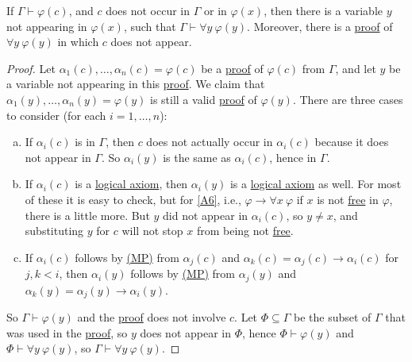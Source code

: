 \begin{lemma}\label{lma:lec8}
	If \(\Gamma \vdash \varphi (c)\), and \(c\) does not occur in \(\Gamma \) or in \(\varphi (x)\), then there is a variable \(y\) not appearing in \(\varphi (x)\), such that \(\Gamma \vdash \forall y\ \varphi (y)\). Moreover, there is a \hyperref[def:proof]{proof} of \(\forall y\ \varphi (y)\) in which \(c\) does not appear.
\end{lemma}
\begin{proof}
	Let \(\alpha _1(c), \ldots , \alpha _n(c) = \varphi (c)\) be a \hyperref[def:proof]{proof} of \(\varphi (c)\) from \(\Gamma \), and let \(y\) be a variable not appearing in this \hyperref[def:proof]{proof}. We claim that \(\alpha _1(y), \ldots , \alpha _n(y) = \varphi (y)\) is still a valid \hyperref[def:proof]{proof} of \(\varphi (y)\). There are three cases to consider (for each \(i = 1, \ldots , n\)):
	\begin{enumerate}[(a)]
		\item If \(\alpha _i(c)\) is in \(\Gamma \), then \(c\) does not actually occur in \(\alpha _i(c)\) because it does not appear in \(\Gamma \). So \(\alpha _i(y)\) is the same as \(\alpha _i(c)\), hence in \(\Gamma \).
		\item If \(\alpha _i(c)\) is a \hyperref[def:logical-axioms]{logical axiom}, then \(\alpha _i(y)\) is a \hyperref[def:logical-axioms]{logical axiom} as well. For most of these it is easy to check, but for \autoref{A6}, i.e., \(\varphi \to \forall x\ \varphi \) if \(x\) is not \hyperref[def:free-variable]{free} in \(\varphi \), there is a little more. But \(y\) did not appear in \(\alpha _i(c)\), so \(y \neq x\), and substituting \(y\) for \(c\) will not stop \(x\) from being not \hyperref[def:free-variable]{free}.
		\item If \(\alpha _i(c)\) follows by \hyperref[def:rule-of-inference]{(MP)} from \(\alpha _j(c)\) and \(\alpha _k(c) = \alpha _j(c) \to  \alpha _i(c)\) for \(j, k < i\), then \(\alpha _i(y)\) follows by \hyperref[def:rule-of-inference]{(MP)} from \(\alpha _j(y)\) and \(\alpha _k(y) = \alpha _j(y) \to  \alpha _i(y)\).
	\end{enumerate}
	So \(\Gamma \vdash \varphi (y)\) and the \hyperref[def:proof]{proof} does not involve \(c\). Let \(\Phi \subseteq \Gamma \) be the subset of \(\Gamma \) that was used in the \hyperref[def:proof]{proof}, so \(y\) does not appear in \(\Phi \), hence \(\Phi \vdash \varphi (y)\) and \(\Phi \vdash \forall y\ \varphi (y)\), so \(\Gamma \vdash \forall y\ \varphi (y)\).
\end{proof}

